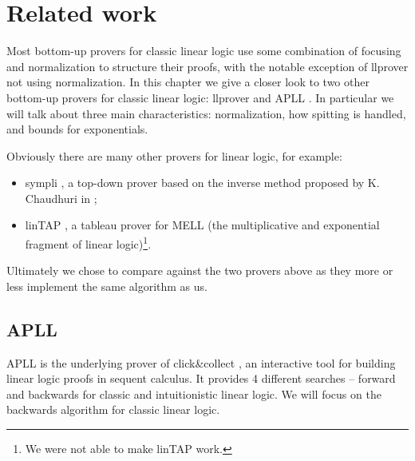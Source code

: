 \chapter{Related work}\label{chapter:related work}
Most bottom-up provers for classic linear logic use some combination of focusing and normalization to structure their proofs, with the notable exception of llprover not using normalization.	%
In this chapter we give a closer look to two other bottom-up provers for classic linear logic: llprover \cite{llprover} and APLL \cite{APLL}.
In particular we will talk about three main characteristics: normalization, how spitting is handled, and bounds for exponentials.

Obviously there are many other provers for linear logic, for example: 
\begin{itemize}
	\item sympli \cite{sympli}, a top-down prover based on the inverse method proposed by K. Chaudhuri in \cite{inverse};
	\item linTAP \cite{linTAPwebsite, linTAP}, a tableau prover for MELL (the multiplicative and exponential fragment of linear logic)\footnote{We were not able to make linTAP work.}.
\end{itemize}
Ultimately we chose to compare against the two provers above as they more or less implement the same algorithm as us.

\section{APLL}\label{sec:apll}
APLL is the underlying prover of click\&collect \cite{clickAndCollect}, an interactive tool for building linear logic proofs in sequent calculus.
It provides 4 different searches -- forward and backwards for classic and intuitionistic linear logic. 
We will focus on the backwards algorithm for classic linear logic.

